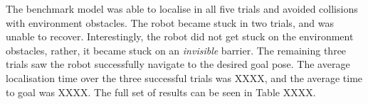 \documentclass[a4paper]{article}
\begin{document}
\begin{minipage}[t]{0.45\textwidth}
\centering
{}
\end{minipage}
\hspace{1cm}
\begin{minipage}[t]{0.45\textwidth}
\centering
{}
\end{minipage}

\vspace{0.25cm}

\begin{minipage}{0.45\textwidth}
The benchmark model was able to localise in all five trials and avoided collisions with environment obstacles. The robot became stuck in two trials, and was unable to recover. Interestingly, the robot did not get stuck on the environment obstacles, rather, it became stuck on an \textit{invisible} barrier. The remaining three trials saw the robot successfully navigate to the desired goal pose. The average localisation time over the three successful trials was XXXX, and the average time to goal was XXXX. The full set of results can be seen in Table XXXX.
\end{minipage}
\hspace{1cm}
\begin{minipage}{0.45\textwidth}
\centering
{}
\end{minipage}
\end{document}
